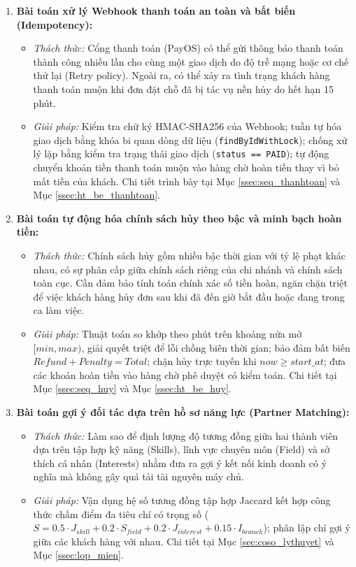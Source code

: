 \begin{enumerate}
    \item \textbf{Bài toán xử lý Webhook thanh toán an toàn và bất biến (Idempotency):}
    \begin{itemize}
        \item \textit{Thách thức:} Cổng thanh toán (PayOS) có thể gửi thông báo thanh toán thành công nhiều lần cho cùng một giao dịch do độ trễ mạng hoặc cơ chế thử lại (Retry policy). Ngoài ra, có thể xảy ra tình trạng khách hàng thanh toán muộn khi đơn đặt chỗ đã bị tác vụ nền hủy do hết hạn 15 phút.
        \item \textit{Giải pháp:} Kiểm tra chữ ký HMAC-SHA256 của Webhook; tuần tự hóa giao dịch bằng khóa bi quan dòng dữ liệu (\texttt{findByIdWithLock}); chống xử lý lặp bằng kiểm tra trạng thái giao dịch (\texttt{status == PAID}); tự động chuyển khoản tiền thanh toán muộn vào hàng chờ hoàn tiền thay vì bỏ mất tiền của khách. Chi tiết trình bày tại Mục \ref{ssec:seq_thanhtoan} và Mục \ref{ssec:ht_be_thanhtoan}.
    \end{itemize}

    \item \textbf{Bài toán tự động hóa chính sách hủy theo bậc và minh bạch hoàn tiền:}
    \begin{itemize}
        \item \textit{Thách thức:} Chính sách hủy gồm nhiều bậc thời gian với tỷ lệ phạt khác nhau, có sự phân cấp giữa chính sách riêng của chi nhánh và chính sách toàn cục. Cần đảm bảo tính toán chính xác số tiền hoàn, ngăn chặn triệt để việc khách hàng hủy đơn sau khi đã đến giờ bắt đầu hoặc đang trong ca làm việc.
        \item \textit{Giải pháp:} Thuật toán so khớp theo phút trên khoảng nửa mở $[min, max)$, giải quyết triệt để lỗi chồng biên thời gian; bảo đảm bất biến $Refund + Penalty = Total$; chặn hủy trực tuyến khi $now \ge start\_at$; đưa các khoản hoàn tiền vào hàng chờ phê duyệt có kiểm toán. Chi tiết tại Mục \ref{ssec:seq_huy} và Mục \ref{ssec:ht_be_huy}.
    \end{itemize}

    \item \textbf{Bài toán gợi ý đối tác dựa trên hồ sơ năng lực (Partner Matching):}
    \begin{itemize}
        \item \textit{Thách thức:} Làm sao để định lượng độ tương đồng giữa hai thành viên dựa trên tập hợp kỹ năng (Skills), lĩnh vực chuyên môn (Field) và sở thích cá nhân (Interests) nhằm đưa ra gợi ý kết nối kinh doanh có ý nghĩa mà không gây quá tải tài nguyên máy chủ.
        \item \textit{Giải pháp:} Vận dụng hệ số tương đồng tập hợp Jaccard kết hợp công thức chấm điểm đa tiêu chí có trọng số ($S = 0.5 \cdot J_{skill} + 0.2 \cdot S_{field} + 0.2 \cdot J_{interest} + 0.15 \cdot I_{branch}$); phân lập chỉ gợi ý giữa các khách hàng với nhau. Chi tiết tại Mục \ref{sec:coso_lythuyet} và Mục \ref{ssec:lop_mien}.
    \end{itemize}


\end{enumerate}
